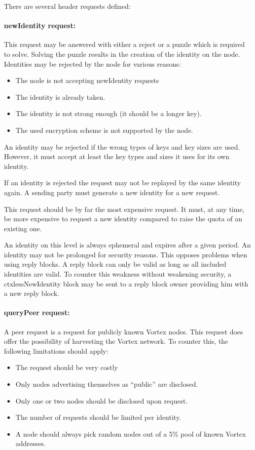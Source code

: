 There are several header requests defined:

\paragraph{newIdentity request:} This request may be answered with either a reject or a puzzle which is required to solve. Solving the puzzle results in the creation of the identity on the node. Identities may be rejected by the node for various reasons:

\begin{itemize}
	\item The node is not accepting newIdentity requests
	\item The identity is already taken.
	\item The identity is not strong enough (it should be a longer key).
	\item The used encryption scheme is not supported by the node.
\end{itemize}

An identity may be rejected if the wrong types of keys and key sizes are used. However, it must accept at least the key types and sizes it uses for its own identity.

If an identity is rejected the request may not be replayed by the same identity again. A sending party must generate a new identity for a new request. 

This request should be by far the most expensive request. It must, at any time, be more expensive to request a new identity compared to raise the quota of an existing one.

An identity on this level is always ephemeral and expires after a given period. An identity may not be prolonged for security reasons. This opposes problems when using reply blocks. A reply block can only be valid as long as all included identities are valid. To counter this weakness without weakening security, a ctxlessNewIdentity block may be sent to a reply block owner providing him with a new reply block.

\paragraph{queryPeer request:} A peer request is a request for publicly known Vortex nodes. This request does offer the possibility of harvesting the Vortex network. To counter this, the following limitations should apply:
\begin{itemize}
	\item The request should be very costly
	\item Only nodes advertising themselves as ``public'' are disclosed.
	\item Only one or two nodes should be disclosed upon request.
	\item The number of requests should be limited per identity.
	\item A node should always pick random nodes out of a 5\% pool of known Vortex addresses.
\end{itemize}

